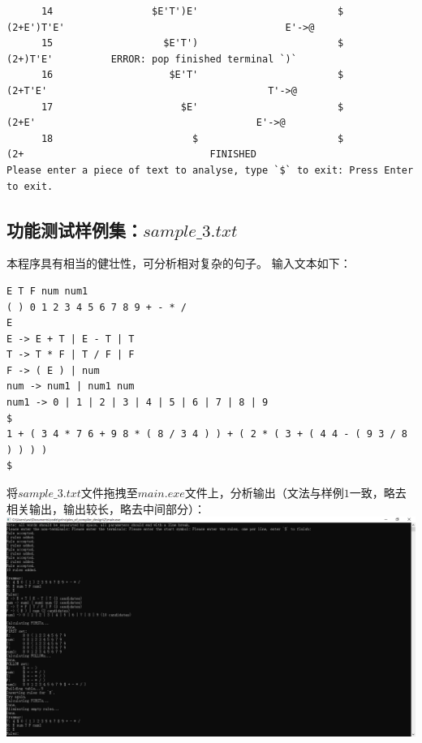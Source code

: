 \documentclass[UTF8]{ctexart}
\begin{document}
\begin{lstlisting}
      14                 $E'T')E'                        $                           (2+E')T'E'                                      E'->@
      15                   $E'T')                        $                           (2+)T'E'          ERROR: pop finished terminal `)`
      16                    $E'T'                        $                           (2+T'E'                                      T'->@
      17                      $E'                        $                           (2+E'                                      E'->@
      18                        $                        $                           (2+                                FINISHED
Please enter a piece of text to analyse, type `$` to exit: Press Enter to exit.
    \end{lstlisting}
\subsection{功能测试样例集：$sample\_3.txt$}
本程序具有相当的健壮性，可分析相对复杂的句子。
输入文本如下：
\begin{lstlisting}
E T F num num1
( ) 0 1 2 3 4 5 6 7 8 9 + - * /
E
E -> E + T | E - T | T
T -> T * F | T / F | F
F -> ( E ) | num
num -> num1 | num1 num
num1 -> 0 | 1 | 2 | 3 | 4 | 5 | 6 | 7 | 8 | 9
$
1 + ( 3 4 * 7 6 + 9 8 * ( 8 / 3 4 ) ) + ( 2 * ( 3 + ( 4 4 - ( 9 3 / 8 ) ) ) )
$
    \end{lstlisting}
将$sample\_3.txt$文件拖拽至$main.exe$文件上，分析输出（文法与样例$1$一致，略去相关输出，输出较长，略去中间部分）： \\
\includegraphics[width=\textwidth]{sample_3}
\end{document}
